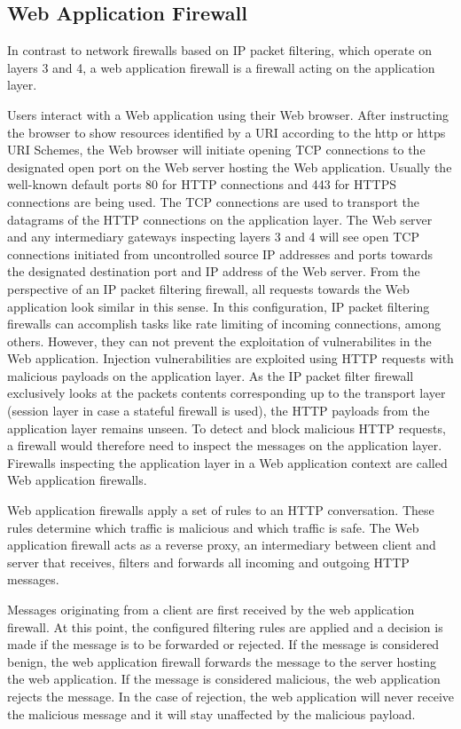 \subsection{Web Application Firewall}
\label{sec:waf}
In contrast to network firewalls based on IP packet filtering, which operate on layers 3 and 4, a web application firewall is a firewall acting on the application layer.

Users interact with a Web application using their Web browser.
After instructing the browser to show resources identified by a URI according to the http or https URI Schemes, the Web browser will initiate opening TCP connections to the designated open port on the Web server hosting the Web application.
Usually the well-known default ports 80 for HTTP connections and 443 for HTTPS connections are being used.
The TCP connections are used to transport the datagrams of the HTTP connections on the application layer. \cite{rfc7230}
The Web server and any intermediary gateways inspecting layers 3 and 4 will see open TCP connections initiated from uncontrolled source IP addresses and ports towards the designated destination port and IP address of the Web server.
From the perspective of an IP packet filtering firewall, all requests towards the Web application look similar in this sense.
In this configuration, IP packet filtering firewalls can accomplish tasks like rate limiting of incoming connections, among others.
However, they can not prevent the exploitation of vulnerabilites in the Web application.
Injection vulnerabilities are exploited using HTTP requests with malicious payloads on the application layer.
As the IP packet filter firewall exclusively looks at the packets contents corresponding up to the transport layer (session layer in case a stateful firewall is used), the HTTP payloads from the application layer remains unseen.
To detect and block malicious HTTP requests, a firewall would therefore need to inspect the messages on the application layer. Firewalls inspecting the application layer in a Web application context are called Web application firewalls.

Web application firewalls apply a set of rules to an HTTP conversation.
These rules determine which traffic is malicious and which traffic is safe.
The Web application firewall acts as a reverse proxy, an intermediary between client and server that receives, filters and forwards all incoming and outgoing HTTP messages. \cite{OWASP/waf,f5/waf}

Messages originating from a client are first received by the web application firewall.
At this point, the configured filtering rules are applied and a decision is made if the message is to be forwarded or rejected.
If the message is considered benign, the web application firewall forwards the message to the server hosting the web application.
If the message is considered malicious, the web application rejects the message.
In the case of rejection, the web application will never receive the malicious message and it will stay unaffected by the malicious payload.


